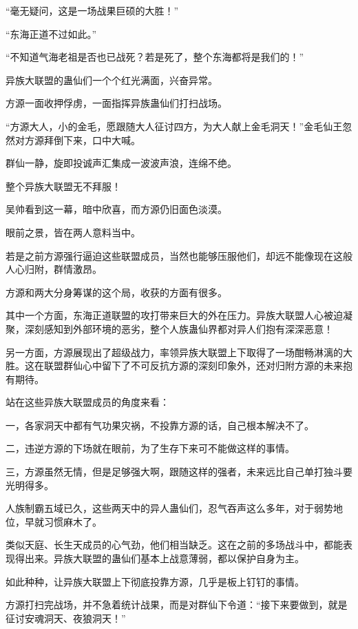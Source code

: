 
\begin{this_body}

“毫无疑问，这是一场战果巨硕的大胜！”

“东海正道不过如此。”

“不知道气海老祖是否也已战死？若是死了，整个东海都将是我们的！”

异族大联盟的蛊仙们一个个红光满面，兴奋异常。

方源一面收押俘虏，一面指挥异族蛊仙们打扫战场。

“方源大人，小的金毛，愿跟随大人征讨四方，为大人献上金毛洞天！”金毛仙王忽然对方源拜倒下来，口中大喊。

群仙一静，旋即投诚声汇集成一波波声浪，连绵不绝。

整个异族大联盟无不拜服！

吴帅看到这一幕，暗中欣喜，而方源仍旧面色淡漠。

眼前之景，皆在两人意料当中。

若是之前方源强行逼迫这些联盟成员，当然也能够压服他们，却远不能像现在这般人心归附，群情激昂。

方源和两大分身筹谋的这个局，收获的方面有很多。

其中一个方面，东海正道联盟的攻打带来巨大的外在压力。异族大联盟人心被迫凝聚，深刻感知到外部环境的恶劣，整个人族蛊仙界都对异人们抱有深深恶意！

另一方面，方源展现出了超级战力，率领异族大联盟上下取得了一场酣畅淋漓的大胜。这在联盟群仙心中留下了不可反抗方源的深刻印象外，还对归附方源的未来抱有期待。

站在这些异族大联盟成员的角度来看：

一，各家洞天中都有气功果灾祸，不投靠方源的话，自己根本解决不了。

二，违逆方源的下场就在眼前，为了生存下来可不能做这样的事情。

三，方源虽然无情，但是足够强大啊，跟随这样的强者，未来远比自己单打独斗要光明得多。

人族制霸五域已久，这些两天中的异人蛊仙们，忍气吞声这么多年，对于弱势地位，早就习惯麻木了。

类似天庭、长生天成员的心气劲，他们相当缺乏。这在之前的多场战斗中，都能表现得出来。异族大联盟的蛊仙们基本上战意薄弱，都以保护自身为主。

如此种种，让异族大联盟上下彻底投靠方源，几乎是板上钉钉的事情。

方源打扫完战场，并不急着统计战果，而是对群仙下令道：“接下来要做到，就是征讨安魂洞天、夜狼洞天！”


\end{this_body}
